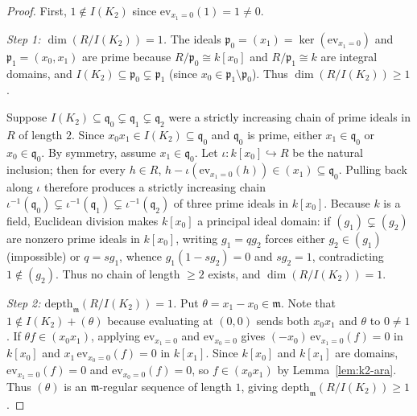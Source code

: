 \documentclass[11pt,a4paper]{amsart}
\theoremstyle{plain}
\theoremstyle{definition}
\newcommand{\depth}{\mathrm{depth}}
\newcommand{\mm}{\mathfrak{m}}
\newcommand{\pp}{\mathfrak{p}}
\begin{document}
\begin{proof}
First, $1 \notin I(K_2)$ since $\mathrm{ev}_{x_1=0}(1) = 1 \neq 0$.

\smallskip
\noindent\emph{Step 1: $\dim(R/I(K_2)) = 1$.}
The ideals $\pp_0 = (x_1) = \ker(\mathrm{ev}_{x_1=0})$ and $\pp_1 = (x_0, x_1)$ are prime because $R/\pp_0 \cong k[x_0]$ and $R/\pp_1 \cong k$ are integral domains, and $I(K_2) \subseteq \pp_0 \subsetneq \pp_1$ (since $x_0 \in \pp_1 \setminus \pp_0$). Thus $\dim(R/I(K_2)) \ge 1$.

Suppose $I(K_2) \subseteq \mathfrak{q}_0 \subsetneq \mathfrak{q}_1 \subsetneq \mathfrak{q}_2$ were a strictly increasing chain of prime ideals in $R$ of length $2$. Since $x_0 x_1 \in I(K_2) \subseteq \mathfrak{q}_0$ and $\mathfrak{q}_0$ is prime, either $x_1 \in \mathfrak{q}_0$ or $x_0 \in \mathfrak{q}_0$. By symmetry, assume $x_1 \in \mathfrak{q}_0$. Let $\iota : k[x_0] \hookrightarrow R$ be the natural inclusion; then for every $h \in R$, $h - \iota(\mathrm{ev}_{x_1=0}(h)) \in (x_1) \subseteq \mathfrak{q}_0$. Pulling back along $\iota$ therefore produces a strictly increasing chain $\iota^{-1}(\mathfrak{q}_0) \subsetneq \iota^{-1}(\mathfrak{q}_1) \subsetneq \iota^{-1}(\mathfrak{q}_2)$ of three prime ideals in $k[x_0]$. Because $k$ is a field, Euclidean division makes $k[x_0]$ a principal ideal domain: if $(g_1) \subsetneq (g_2)$ are nonzero prime ideals in $k[x_0]$, writing $g_1 = q g_2$ forces either $g_2 \in (g_1)$ (impossible) or $q = s g_1$, whence $g_1(1 - s g_2) = 0$ and $s g_2 = 1$, contradicting $1 \notin (g_2)$. Thus no chain of length $\ge 2$ exists, and $\dim(R/I(K_2)) = 1$.

\smallskip
\noindent\emph{Step 2: $\depth_{\mm}(R/I(K_2)) = 1$.}
Put $\theta = x_1 - x_0 \in \mm$. Note that $1 \notin I(K_2) + (\theta)$ because evaluating at $(0,0)$ sends both $x_0 x_1$ and $\theta$ to $0 \neq 1$. If $\theta f \in (x_0 x_1)$, applying $\mathrm{ev}_{x_1=0}$ and $\mathrm{ev}_{x_0=0}$ gives $(-x_0)\,\mathrm{ev}_{x_1=0}(f) = 0$ in $k[x_0]$ and $x_1\,\mathrm{ev}_{x_0=0}(f) = 0$ in $k[x_1]$. Since $k[x_0]$ and $k[x_1]$ are domains, $\mathrm{ev}_{x_1=0}(f) = 0$ and $\mathrm{ev}_{x_0=0}(f) = 0$, so $f \in (x_0 x_1)$ by Lemma~\ref{lem:k2-ara}. Thus $(\theta)$ is an $\mm$-regular sequence of length $1$, giving $\depth_{\mm}(R/I(K_2)) \ge 1$.


\end{proof}
\end{document}
